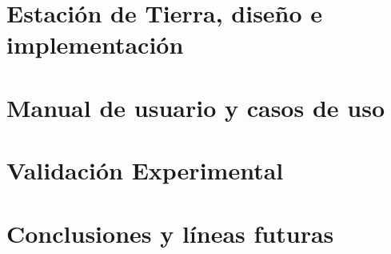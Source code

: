 \documentclass[a4paper, 12pt]{memoir} %
\begin{document}
\chapter{Estación de Tierra, diseño e implementación} \label{chapter:dis-impl}


\chapter{Manual de usuario y casos de uso} \label{chapter:results}


\chapter{Validación Experimental} \label{chapter:experim}


\chapter{Conclusiones y líneas futuras} \label{chapter:concl}


% 

% 


\glsaddall %

\end{document}
